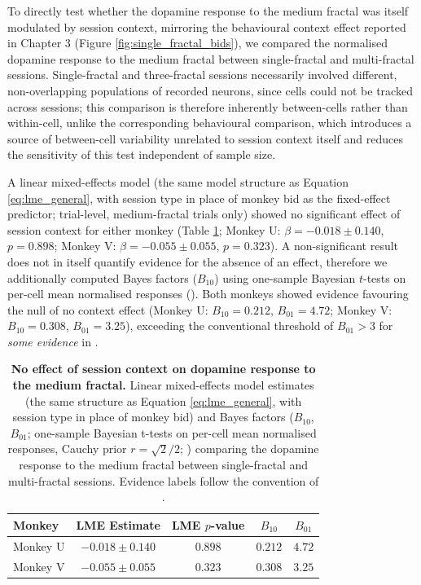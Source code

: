 To directly test whether the dopamine response to the medium fractal was itself modulated by session context, mirroring the behavioural context effect reported in Chapter 3 (Figure \ref{fig:single_fractal_bids}), we compared the normalised dopamine response to the medium fractal between single-fractal and multi-fractal sessions. Single-fractal and three-fractal sessions necessarily involved different, non-overlapping populations of recorded neurons, since cells could not be tracked across sessions; this comparison is therefore inherently between-cells rather than within-cell, unlike the corresponding behavioural comparison, which introduces a source of between-cell variability unrelated to session context itself and reduces the sensitivity of this test independent of sample size.

A linear mixed-effects model (the same model structure as Equation \ref{eq:lme_general}, with session type in place of monkey bid as the fixed-effect predictor; trial-level, medium-fractal trials only) showed no significant effect of session context for either monkey (Table \ref{tab:context_comparison}; Monkey U: $\beta = -0.018 \pm 0.140$, $p = 0.898$; Monkey V: $\beta = -0.055 \pm 0.055$, $p = 0.323$). A non-significant result does not in itself quantify evidence for the absence of an effect, therefore we additionally computed Bayes factors ($B_{10}$) using one-sample Bayesian $t$-tests on per-cell mean normalised responses (\cite{rouder2009bayesian}). Both monkeys showed evidence favouring the null of no context effect (Monkey U: $B_{10} = 0.212$, $B_{01} = 4.72$; Monkey V: $B_{10} = 0.308$, $B_{01} = 3.25$), exceeding the conventional threshold of $B_{01} > 3$ for \textit{some evidence} in \cite{jeffreys1961theory}.

\begin{table}[htbp]
\centering
\begin{tabular}{lcccc}
\hline
\textbf{Monkey} & \textbf{LME Estimate} & \textbf{LME $p$-value} & \textbf{$B_{10}$} & \textbf{$B_{01}$} \\
\hline
Monkey U & $-0.018 \pm 0.140$ & $0.898$ & $0.212$ & $4.72$ \\
Monkey V & $-0.055 \pm 0.055$ & $0.323$ & $0.308$ & $3.25$ \\
\hline
\end{tabular}
\caption[No effect of session context on dopamine response to the medium fractal.]{\textbf{No effect of session context on dopamine response to the medium fractal.} Linear mixed-effects model estimates (the same structure as Equation \ref{eq:lme_general}, with session type in place of monkey bid) and Bayes factors ($B_{10}$, $B_{01}$; one-sample Bayesian t-tests on per-cell mean normalised responses, Cauchy prior $r=\sqrt{2}/2$; \cite{rouder2009bayesian}) comparing the dopamine response to the medium fractal between single-fractal and multi-fractal sessions. Evidence labels follow the convention of \cite{jeffreys1961theory}.}
\label{tab:context_comparison}
\end{table}

